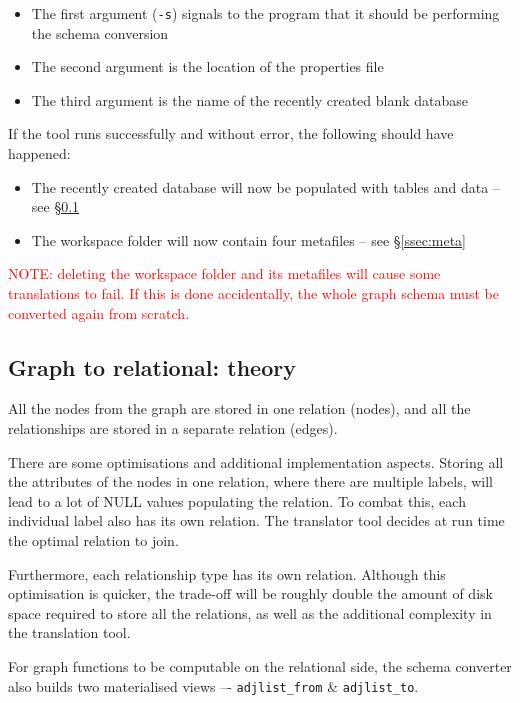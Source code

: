 \documentclass[letterpaper]{ltxdoc}
\begin{document}
\medskip

\begin{itemize}
\item The first argument (\texttt{-s}) signals to the program that it should be performing the schema conversion
\item The second argument is the location of the properties file
\item The third argument is the name of the recently created blank database
\end{itemize}

\medskip

If the tool runs successfully and without error, the following should have happened:

\begin{itemize}
\item The recently created database will now be populated with tables and data -- see \S \ref{ssec:grreltheory}
\item The workspace folder will now contain four metafiles -- see \S \ref{ssec:meta}
\end{itemize}

\medskip

\textcolor{red}{NOTE: deleting the workspace folder and its metafiles will cause some translations to fail. If this is done accidentally, the whole graph schema must be converted again from scratch.}


\subsection{Graph to relational: theory}
\label{ssec:grreltheory}
All the nodes from the graph are stored in one relation (nodes), and all the relationships are stored in a separate relation (edges).

There are some optimisations and additional implementation aspects. Storing all the attributes of the nodes in one relation, where there are multiple labels, will lead to a lot of NULL values populating the relation. To combat this, each individual label also has its own relation. The translator tool decides at run time the optimal relation to join.

Furthermore, each relationship type has its own relation. Although this optimisation is quicker, the trade-off will be roughly double the amount of disk space required to store all the relations, as well as the additional complexity in the translation tool.

For graph functions to be computable on the relational side, the schema converter also builds two materialised views –- \texttt{adjlist\_from} \& \texttt{adjlist\_to}.
\end{document}
